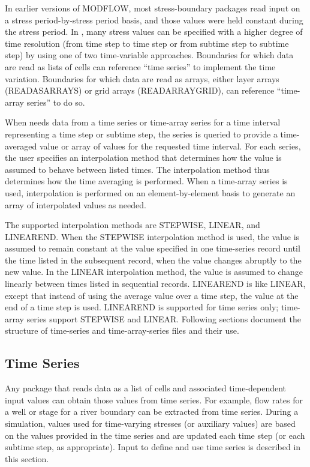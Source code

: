 
In earlier versions of MODFLOW, most stress-boundary packages read input on a stress period-by-stress period basis, and those values were held constant during the stress period. In \programname{}, many stress values can be specified with a higher degree of time resolution (from time step to time step or from subtime step to subtime step) by using one of two time-variable approaches. Boundaries for which data are read as lists of cells can reference ``time series'' to implement the time variation. Boundaries for which data are read as arrays, either layer arrays (READASARRAYS) or grid arrays (READARRAYGRID), can reference ``time-array series'' to do so.

When \programname{} needs data from a time series or time-array series for a time interval representing a time step or subtime step, the series is queried to provide a time-averaged value or array of values for the requested time interval.  For each series, the user specifies an interpolation method that determines how the value is assumed to behave between listed times. The interpolation method thus determines how the time averaging is performed. When a time-array series is used, interpolation is performed on an element-by-element basis to generate an array of interpolated values as needed.

The supported interpolation methods are STEPWISE, LINEAR, and LINEAREND. When the STEPWISE interpolation method is used, the value is assumed to remain constant at the value specified in one time-series record until the time listed in the subsequent record, when the value changes abruptly to the new value. In the LINEAR interpolation method, the value is assumed to change linearly between times listed in sequential records. LINEAREND is like LINEAR, except that instead of using the average value over a time step, the value at the end of a time step is used. LINEAREND is supported for time series only; time-array series support STEPWISE and LINEAR. Following sections document the structure of time-series and time-array-series files and their use.

\subsection{Time Series}

Any package that reads data as a list of cells and associated time-dependent input values can obtain those values from time series. For example, flow rates for a well or stage for a river boundary can be extracted from time series. During a simulation, values used for time-varying stresses (or auxiliary values) are based on the values provided in the time series and are updated each time step (or each subtime step, as appropriate). Input to define and use time series is described in this section.

